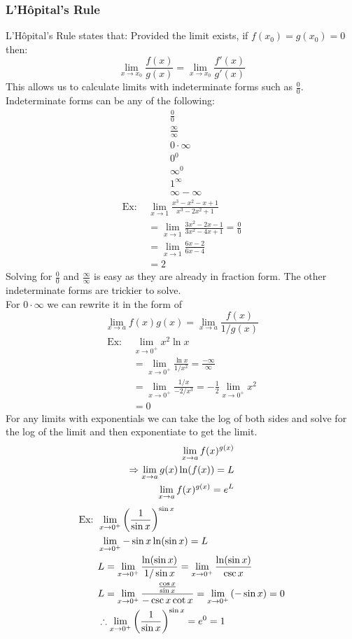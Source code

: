\documentclass[11pt, fleqn]{article}
\begin{document}
\subsubsection{L'H\^opital's Rule}
L'H\^opital's Rule states that: Provided the limit exists, if $f(x_0)=g(x_0)=0$ then:
$$\lim_{x\to x_0}\frac{f(x)}{g(x)}=\lim_{x\to x_0}\frac{f'(x)}{g'(x)}$$
This allows us to calculate limits with indeterminate forms such as $\frac{0}{0}$.\\
Indeterminate forms can be any of the following:
\begin{align*}
    &\frac{0}{0}\\
    &\frac{\infty}{\infty}\\
    &0\cdot\infty\\
    &0^0\\
    &\infty^0\\
    &1^\infty\\
    &\infty-\infty
\end{align*}
\begin{align*}
    \text{Ex: }&\lim_{x\to 1}\frac{x^3-x^2-x+1}{x^3-2x^2+1}\\
    &=\lim_{x\to 1}\frac{3x^2-2x-1}{3x^2-4x+1}=\frac{0}{0}\\
    &=\lim_{x\to 1}\frac{6x-2}{6x-4}\\
    &=2
\end{align*}
Solving for $\frac{0}{0}$ and $\frac{\infty}{\infty}$ is easy as they are already in fraction form. The other indeterminate forms are trickier to solve.\\
For $0\cdot\infty$ we can rewrite it in the form of
    $$\lim_{x\to a}f(x)g(x)=\lim_{x\to a}\frac{f(x)}{1/g(x)}$$
\begin{align*}
    \text{Ex: }&\lim_{x\to 0^+}x^2\ln x\\
    &=\lim_{x\to 0^+}\frac{\ln x}{1/x^2}=\frac{-\infty}{\infty}\\
    &=\lim_{x\to 0^+}\frac{1/x}{-2/x^3}=-\frac{1}{2}\lim_{x\to 0^+}x^2\\
    &=0
\end{align*}
For any limits with exponentials we can take the log of both sides and solve for the log of the limit and then exponentiate to get the limit.
\begin{align*}
    \lim_{x\to a}f(x)^{g(x)}\\
    \Rightarrow\lim_{x\to a}g(x)\ln(f(x))=L\\
    \lim_{x\to a}f(x)^{g(x)}=e^L
\end{align*}
\begin{align*}
    \text{Ex: }&\lim_{x\to 0^+}\left( \frac{1}{\sin x} \right)^{\sin x}\\
    &\lim_{x\to 0^+}-\sin x\ln(\sin x)=L\\
    &L=\lim_{x\to 0^+}\frac{\ln(\sin x)}{1/\sin x}=\lim_{x\to 0^+}\frac{\ln(\sin x)}{\csc x}\\
    &L=\lim_{x\to 0^+}\frac{\frac{\cos x}{\sin x}}{-\csc x\cot x}=\lim_{x\to 0^+}\left( -\sin x \right)=0\\
    &\therefore \lim_{x\to 0^+}\left( \frac{1}{\sin x} \right)^{\sin x}=e^0=1
\end{align*}
\end{document}
